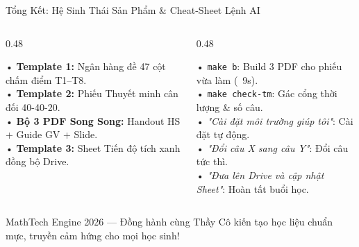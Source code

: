 \documentclass[aspectratio=169,11pt]{beamer}
\begin{document}
\begin{frame}{Tổng Kết: Hệ Sinh Thái Sản Phẩm \& Cheat-Sheet Lệnh AI}
  \begin{columns}[T]
    \begin{column}{0.48\textwidth}
      \begin{tcolorbox}[slidecard, title=Hệ Sinh Thái Hoàn Thành Mỗi Chương]
        \scriptsize
        • \textbf{Template 1:} Ngân hàng đề 47 cột chấm điểm T1–T8.\\
        • \textbf{Template 2:} Phiếu Thuyết minh cân đối 40-40-20.\\
        • \textbf{Bộ 3 PDF Song Song:} Handout HS + Guide GV + Slide.\\
        • \textbf{Template 3:} Sheet Tiến độ tích xanh đồng bộ Drive.
      \end{tcolorbox}
    \end{column}

    \begin{column}{0.48\textwidth}
      \begin{tcolorbox}[accentcard, title=Cheat-Sheet Câu Lệnh Cho Giáo Viên]
        \scriptsize
        • \texttt{make b}: Build 3 PDF cho phiếu vừa làm (~9s).\\
        • \texttt{make check-tm}: Gác cổng thời lượng \& số câu.\\
        • \textit{"Cài đặt môi trường giúp tôi"}: Cài đặt tự động.\\
        • \textit{"Đổi câu X sang câu Y"}: Đổi câu tức thì.\\
        • \textit{"Đưa lên Drive và cập nhật Sheet"}: Hoàn tất buổi học.
      \end{tcolorbox}
    \end{column}
  \end{columns}
  \vspace{2pt}
  \begin{tcolorbox}[slidecard]
    \centering\tiny\color{muted}
    MathTech Engine 2026 — Đồng hành cùng Thầy Cô kiến tạo học liệu chuẩn mực, truyền cảm hứng cho mọi học sinh!
  \end{tcolorbox}
\end{frame}
\end{document}
